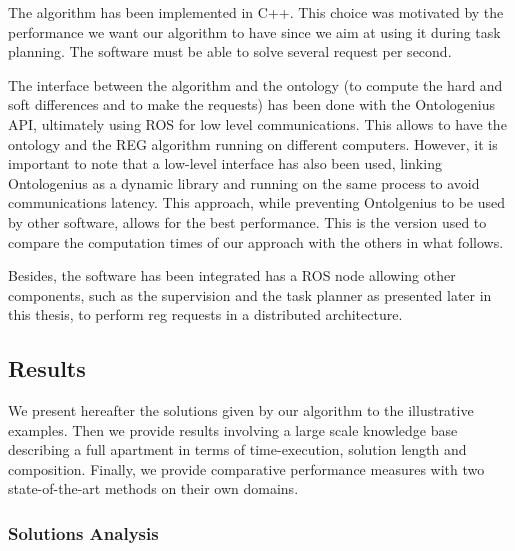 \documentclass[a4paper,11pt,twoside]{StyleThese}
\begin{document}
The algorithm has been implemented in C++. This choice was motivated by the performance we want our algorithm to have since we aim at using it during task planning. The software must be able to solve several request per second.

The interface between the algorithm and the ontology (to compute the hard and soft differences and to make the \sparql{} requests) has been done with the Ontologenius API, ultimately using ROS for low level communications. This allows to have the ontology and the REG algorithm running on different computers. However, it is important to note that a low-level interface has also been used, linking Ontologenius as a dynamic library and running on the same process to avoid communications latency. This approach, while preventing Ontolgenius to be used by other software, allows for the best performance. This is the version used to compare the computation times of our approach with the others in what follows.

Besides, the software has been integrated has a ROS node allowing other components, such as the supervision and the task planner as presented later in this thesis, to perform \acrshort{reg} requests in a distributed architecture.


\subsection{Results}
We present hereafter the solutions given by our algorithm to the illustrative examples. Then we provide results involving a large scale knowledge base describing a full apartment in terms of time-execution, solution length and composition. Finally, we provide comparative performance measures with two state-of-the-art methods on their own domains.

\subsubsection{Solutions Analysis}
\end{document}
